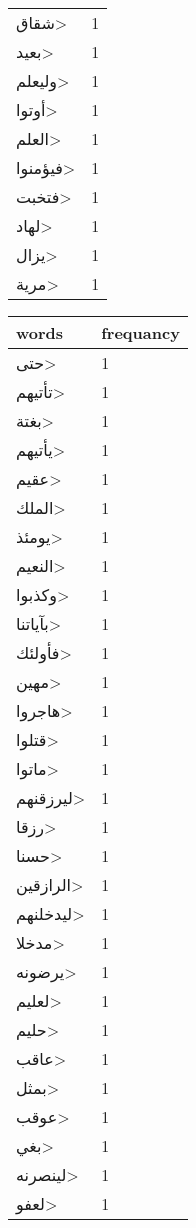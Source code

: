 \documentclass{article}
\begin{document}
\begin{multicols}{3}
\begin{center}
\begin{tabular}{ P{2cm}  P{1cm}}
\<شقاق> & 1 \\ 
\<بعيد> & 1 \\ 
\<وليعلم> & 1 \\ 
\<أوتوا> & 1 \\ 
\<العلم> & 1 \\ 
\<فيؤمنوا> & 1 \\ 
\<فتخبت> & 1 \\ 
\<لهاد> & 1 \\ 
\<يزال> & 1 \\ 
\<مرية> & 1 \\ 
\end{tabular} 
\begin{tabular}{ P{2cm}  P{1cm}} 
\textbf{words}    & \textbf{frequancy}  \\
\hline
\<حتى> & 1 \\ 
\<تأتيهم> & 1 \\ 
\<بغتة> & 1 \\ 
\<يأتيهم> & 1 \\ 
\<عقيم> & 1 \\ 
\<الملك> & 1 \\ 
\<يومئذ> & 1 \\ 
\<النعيم> & 1 \\ 
\<وكذبوا> & 1 \\ 
\<بآياتنا> & 1 \\ 
\<فأولئك> & 1 \\ 
\<مهين> & 1 \\ 
\<هاجروا> & 1 \\ 
\<قتلوا> & 1 \\ 
\<ماتوا> & 1 \\ 
\<ليرزقنهم> & 1 \\ 
\<رزقا> & 1 \\ 
\<حسنا> & 1 \\ 
\<الرازقين> & 1 \\ 
\<ليدخلنهم> & 1 \\ 
\<مدخلا> & 1 \\ 
\<يرضونه> & 1 \\ 
\<لعليم> & 1 \\ 
\<حليم> & 1 \\ 
\<عاقب> & 1 \\ 
\<بمثل> & 1 \\ 
\<عوقب> & 1 \\ 
\<بغي> & 1 \\ 
\<لينصرنه> & 1 \\ 
\<لعفو> & 1 \\ 
\end{tabular} 
\begin{tabular}{ P{2cm}  P{1cm}} 

\end{tabular}
\end{center}
\end{multicols}
\end{document}
